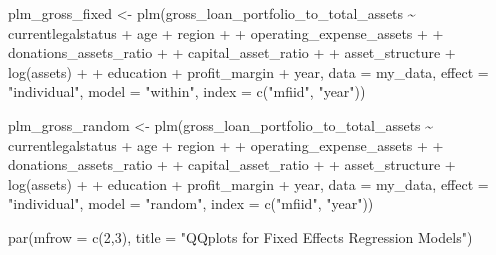 \documentclass[a4paper,nobind]{templates/ociamthesis}
\newenvironment{Shaded}{\begin{snugshade}}{\end{snugshade}}
\newcommand{\AttributeTok}[1]{\textcolor[rgb]{0.77,0.63,0.00}{#1}}
\newcommand{\DecValTok}[1]{\textcolor[rgb]{0.00,0.00,0.81}{#1}}
\newcommand{\FunctionTok}[1]{\textcolor[rgb]{0.00,0.00,0.00}{#1}}
\newcommand{\NormalTok}[1]{#1}
\newcommand{\OtherTok}[1]{\textcolor[rgb]{0.56,0.35,0.01}{#1}}
\newcommand{\SpecialCharTok}[1]{\textcolor[rgb]{0.00,0.00,0.00}{#1}}
\newcommand{\StringTok}[1]{\textcolor[rgb]{0.31,0.60,0.02}{#1}}
\renewenvironment{Shaded}
{
  \vspace{10pt}%
  \begin{snugshade}%
}{%
  \end{snugshade}%
  \vspace{8pt}%
}
\begin{document}
\begin{landscape}
\begin{Shaded}
\begin{Highlighting}[]
\NormalTok{plm\_gross\_fixed }\OtherTok{\textless{}{-}} \FunctionTok{plm}\NormalTok{(gross\_loan\_portfolio\_to\_total\_assets }\SpecialCharTok{\textasciitilde{}}\NormalTok{ currentlegalstatus }\SpecialCharTok{+}\NormalTok{ age }\SpecialCharTok{+}\NormalTok{ region }\SpecialCharTok{+}
\SpecialCharTok{+}\NormalTok{           operating\_expense\_assets }\SpecialCharTok{+} 
\SpecialCharTok{+}\NormalTok{           donations\_assets\_ratio }\SpecialCharTok{+} 
\SpecialCharTok{+}\NormalTok{           capital\_asset\_ratio }\SpecialCharTok{+}
\SpecialCharTok{+}\NormalTok{           asset\_structure }\SpecialCharTok{+} \FunctionTok{log}\NormalTok{(assets) }\SpecialCharTok{+} 
\SpecialCharTok{+}\NormalTok{           education }\SpecialCharTok{+}\NormalTok{ profit\_margin }\SpecialCharTok{+}\NormalTok{ year, }
               \AttributeTok{data =}\NormalTok{ my\_data, }\AttributeTok{effect =} \StringTok{"individual"}\NormalTok{, }\AttributeTok{model =} \StringTok{"within"}\NormalTok{, }
      \AttributeTok{index =} \FunctionTok{c}\NormalTok{(}\StringTok{"mfiid"}\NormalTok{, }\StringTok{"year"}\NormalTok{))}

\NormalTok{plm\_gross\_random }\OtherTok{\textless{}{-}} \FunctionTok{plm}\NormalTok{(gross\_loan\_portfolio\_to\_total\_assets }\SpecialCharTok{\textasciitilde{}}\NormalTok{ currentlegalstatus }\SpecialCharTok{+}\NormalTok{ age }\SpecialCharTok{+}\NormalTok{ region }\SpecialCharTok{+}
\SpecialCharTok{+}\NormalTok{           operating\_expense\_assets }\SpecialCharTok{+} 
\SpecialCharTok{+}\NormalTok{           donations\_assets\_ratio }\SpecialCharTok{+} 
\SpecialCharTok{+}\NormalTok{           capital\_asset\_ratio }\SpecialCharTok{+}
\SpecialCharTok{+}\NormalTok{           asset\_structure }\SpecialCharTok{+} \FunctionTok{log}\NormalTok{(assets) }\SpecialCharTok{+} 
\SpecialCharTok{+}\NormalTok{           education }\SpecialCharTok{+}\NormalTok{ profit\_margin }\SpecialCharTok{+}\NormalTok{ year, }
               \AttributeTok{data =}\NormalTok{ my\_data, }\AttributeTok{effect =} \StringTok{"individual"}\NormalTok{, }\AttributeTok{model =} \StringTok{"random"}\NormalTok{, }
      \AttributeTok{index =} \FunctionTok{c}\NormalTok{(}\StringTok{"mfiid"}\NormalTok{, }\StringTok{"year"}\NormalTok{))}


\FunctionTok{par}\NormalTok{(}\AttributeTok{mfrow =} \FunctionTok{c}\NormalTok{(}\DecValTok{2}\NormalTok{,}\DecValTok{3}\NormalTok{), }\AttributeTok{title =} \StringTok{"QQplots for Fixed Effects Regression Models"}\NormalTok{)}
\end{Highlighting}
\end{Shaded}


\end{landscape}
\end{document}
